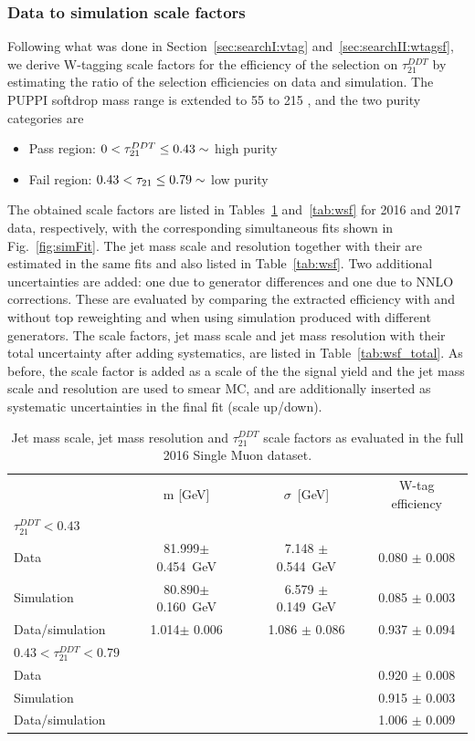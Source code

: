 \subsubsection{Data to simulation scale factors}
\label{sec:searchIII:wtagSF}
Following what was done in Section~\ref{sec:searchI:vtag} and~\ref{sec:searchII:wtagsf}, we derive W-tagging scale factors for the efficiency of the selection on $\tau_{21}^{DDT}$ by estimating the ratio of the selection efficiencies on data and simulation. The PUPPI softdrop mass range is extended to 55 to 215 \GeV, and the two purity categories are
\begin{itemize}
\itemsep0em
  \item Pass region: $0 <  \tau_{21}^{DDT} \leq 0.43 \sim$ high purity
  \item Fail region: $0.43 < \tau_{21} \leq 0.79 \sim$ low purity
\end{itemize}
The obtained scale factors are listed in Tables~\ref{tab:wsf16} and~\ref{tab:wsf} for 2016 and 2017 data, respectively, with the corresponding simultaneous fits shown in Fig.~\ref{fig:simFit}. 
The jet mass scale and resolution together with their are estimated in the same fits and also listed in Table~\ref{tab:wsf}. Two additional uncertainties are added: one due to generator differences and one due to NNLO corrections. These are evaluated by comparing the extracted efficiency with and without top \PT reweighting and when using \ttbar simulation produced with different generators. The scale factors, jet mass scale and jet mass resolution with their total uncertainty after adding systematics, are listed in Table~\ref{tab:wsf_total}. As before, the scale factor is added as a scale of the the signal yield and the jet mass scale and resolution are used to smear MC, and are additionally inserted as systematic uncertainties in the final fit (scale up/down).
 \begin{table}[htbp]
    \centering
    \begin{tabular}{|lccc|}
    \hline
    & m [GeV]           & $\sigma$~[GeV]     & W-tag efficiency\\
    $\tau_{21}^{DDT} < 0.43$ & &&\\ \hline
    \hline
    Data            & 81.999$\pm$ 0.454~GeV   & 7.148 $\pm$ 0.544~GeV & 0.080 $\pm$ 0.008\\
    Simulation      & 80.890$\pm$ 0.160~GeV   & 6.579 $\pm$ 0.149~GeV & 0.085 $\pm$ 0.003\\
    \hline
    Data/simulation & 1.014$\pm$ 0.006       & 1.086 $\pm$ 0.086     & 0.937 $\pm$ 0.094\\
    \hline
    $0.43 < \tau_{21}^{DDT} < 0.79$ & &&\\ \hline
    \hline
    Data            &    &  & 0.920 $\pm$ 0.008\\
    Simulation      &    &  & 0.915 $\pm$ 0.003\\
    \hline
    Data/simulation &    &   & 1.006 $\pm$ 0.009\\
    \hline
    \end{tabular}
     \caption{Jet mass scale, jet mass resolution and $\tau_{21}^{DDT}$ scale factors as evaluated in the full 2016 Single Muon dataset.}
    \label{tab:wsf16}
 \end{table}
